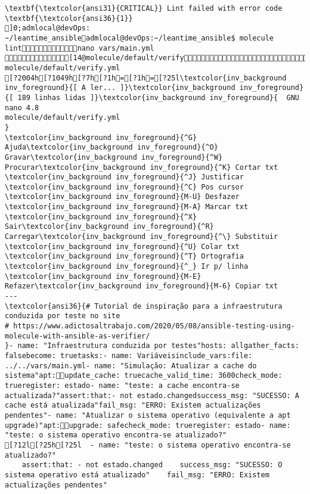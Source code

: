 \documentclass{scrartcl}
\begin{document}
\begin{Verbatim}
\textbf{\textcolor{ansi31}{CRITICAL}} Lint failed with error code \textbf{\textcolor{ansi36}{1}}
]0;admlocal@devOps: ~/leantime_ansibleadmlocal@devOps:~/leantime_ansible$ molecule lintnano vars/main.yml [14@molecule/default/verifyexitnano molecule/default/verify.yml 
[?2004h[?1049h[?7h[?1h=[?1h=[?25l\textcolor{inv_background inv_foreground}{[ A ler... ]}\textcolor{inv_background inv_foreground}{[ 189 linhas lidas ]}\textcolor{inv_background inv_foreground}{  GNU nano 4.8                                          molecule/default/verify.yml                                                       }
\textcolor{inv_background inv_foreground}{^G} Ajuda\textcolor{inv_background inv_foreground}{^O} Gravar\textcolor{inv_background inv_foreground}{^W} Procurar\textcolor{inv_background inv_foreground}{^K} Cortar txt    \textcolor{inv_background inv_foreground}{^J} Justificar    \textcolor{inv_background inv_foreground}{^C} Pos cursor    \textcolor{inv_background inv_foreground}{M-U} Desfazer     \textcolor{inv_background inv_foreground}{M-A} Marcar txt
\textcolor{inv_background inv_foreground}{^X} Sair\textcolor{inv_background inv_foreground}{^R} Carregar\textcolor{inv_background inv_foreground}{^\} Substituir    \textcolor{inv_background inv_foreground}{^U} Colar txt     \textcolor{inv_background inv_foreground}{^T} Ortografia    \textcolor{inv_background inv_foreground}{^_} Ir p/ linha   \textcolor{inv_background inv_foreground}{M-E} Refazer\textcolor{inv_background inv_foreground}{M-6} Copiar txt
---
\textcolor{ansi36}{# Tutorial de inspiração para a infraestrutura conduzida por teste no site
# https://www.adictosaltrabajo.com/2020/05/08/ansible-testing-using-molecule-with-ansible-as-verifier/
}- name: "Infraestrutura conduzida por testes"hosts: allgather_facts: falsebecome: truetasks:- name: Variáveisinclude_vars:file: ../../vars/main.yml- name: "Simulação: Atualizar a cache do sistema"apt:update_cache: truecache_valid_time: 3600check_mode: trueregister: estado- name: "teste: a cache encontra-se actualizada?"assert:that:- not estado.changedsuccess_msg: "SUCESSO: A cache está atualizada"fail_msg: "ERRO: Existem actualizações pendentes"- name: "Atualizar o sistema operativo (equivalente a apt upgrade)"apt:upgrade: safecheck_mode: trueregister: estado- name: "teste: o sistema operativo encontra-se atualizado?"
[?12l[?25h[?25l  - name: "teste: o sistema operativo encontra-se atualizado?"
    assert:that: - not estado.changed    success_msg: "SUCESSO: O sistema operativo está atualizado"    fail_msg: "ERRO: Existem actualizações pendentes"

\end{Verbatim}
\end{document}
